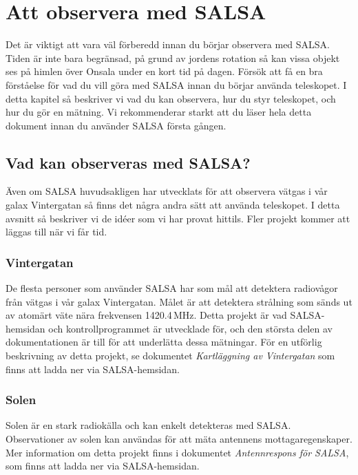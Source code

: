 \chapter{Att observera med SALSA}
Det är viktigt att vara väl förberedd innan du börjar observera med SALSA.
Tiden är inte bara begränsad, på grund av jordens rotation så kan vissa objekt
ses på himlen över Onsala under en kort tid på dagen. Försök att få en bra
förståelse för vad du vill göra med SALSA innan du börjar använda teleskopet.
I detta kapitel så beskriver vi vad du kan observera, hur du styr teleskopet,
och hur du gör en mätning. Vi rekommenderar starkt att du läser hela detta
dokument innan du använder SALSA första gången.

\section{Vad kan observeras med SALSA?}
Även om SALSA huvudsakligen har utvecklats för att observera vätgas i vår 
galax Vintergatan så finns det några andra sätt att använda teleskopet. 
I detta avsnitt så beskriver vi de idéer som vi har provat hittils. Fler
projekt kommer att läggas till när vi får tid. 

\subsection{Vintergatan}
De flesta personer som använder SALSA har som mål att detektera radiovågor från 
vätgas i vår galax Vintergatan. Målet är att detektera strålning som sänds ut av
atomärt väte nära frekvensen 1420.4\,MHz. Detta projekt är vad SALSA-hemsidan
och kontrollprogrammet är utvecklade för, och den största delen av dokumentationen
är till för att underlätta dessa mätningar. För en utförlig beskrivning av detta
projekt, se dokumentet \emph{Kartläggning av Vintergatan} som finns att 
ladda ner via SALSA-hemsidan.

\subsection{Solen}
Solen är en stark radiokälla och kan enkelt detekteras med SALSA. Observationer
av solen kan användas för att mäta antennens mottagaregenskaper. Mer information
om detta projekt finns i dokumentet \emph{Antennrespons för SALSA}, som finns
att ladda ner via SALSA-hemsidan. 

